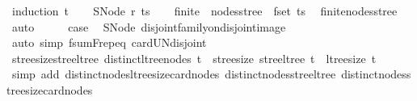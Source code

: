 \begin{isabellebody}
%
\isadelimproof
%
\endisadelimproof
%
\isatagproof
{}\isamarkupfalse%
\ {\isacharparenleft}{\kern0pt}induction\ t{\isacharparenright}{\kern0pt}\isanewline
\ \ \isamarkupfalse%
\ {\isacharparenleft}{\kern0pt}SNode\ r\ ts{\isacharparenright}{\kern0pt}\isanewline
\ \ \isamarkupfalse%
\ {\isachardoublequoteopen}finite\ {\isacharparenleft}{\kern0pt}{\isasymUnion}\ {\isacharparenleft}{\kern0pt}nodes{\isacharunderscore}{\kern0pt}stree\ {\isacharbackquote}{\kern0pt}\ fset\ ts{\isacharparenright}{\kern0pt}{\isacharparenright}{\kern0pt}{\isachardoublequoteclose}\ \isamarkupfalse%
\ finite{\isacharunderscore}{\kern0pt}nodes{\isacharunderscore}{\kern0pt}stree\ \isamarkupfalse%
\ auto\isanewline
\ \ \isamarkupfalse%
\ \isamarkupfalse%
\ {\isacharquery}{\kern0pt}case\ \isamarkupfalse%
\ SNode\ disjoint{\isacharunderscore}{\kern0pt}family{\isacharunderscore}{\kern0pt}on{\isacharunderscore}{\kern0pt}disjoint{\isacharunderscore}{\kern0pt}image\isanewline
\ \ \ \ \isamarkupfalse%
\ {\isacharparenleft}{\kern0pt}auto\ simp{\isacharcolon}{\kern0pt}\ fsum{\isachardot}{\kern0pt}F{\isachardot}{\kern0pt}rep{\isacharunderscore}{\kern0pt}eq\ card{\isacharunderscore}{\kern0pt}UN{\isacharunderscore}{\kern0pt}disjoint{\isacharprime}{\kern0pt}{\isacharparenright}{\kern0pt}\isanewline
{}\isamarkupfalse%
%
\endisatagproof
{\isafoldproof}%
%
\isadelimproof
\isanewline
%
\endisadelimproof
\isanewline
{}\isamarkupfalse%
\ stree{\isacharunderscore}{\kern0pt}size{\isacharunderscore}{\kern0pt}stree{\isacharunderscore}{\kern0pt}ltree{\isacharcolon}{\kern0pt}\ {\isachardoublequoteopen}distinct{\isacharunderscore}{\kern0pt}ltree{\isacharunderscore}{\kern0pt}nodes\ t\ {\isasymLongrightarrow}\ stree{\isacharunderscore}{\kern0pt}size\ {\isacharparenleft}{\kern0pt}stree{\isacharunderscore}{\kern0pt}ltree\ t{\isacharparenright}{\kern0pt}\ {\isacharequal}{\kern0pt}\ ltree{\isacharunderscore}{\kern0pt}size\ t{\isachardoublequoteclose}\isanewline
%
\isadelimproof
\ \ %
\endisadelimproof
%
\isatagproof
{}\isamarkupfalse%
\ {\isacharparenleft}{\kern0pt}simp\ add{\isacharcolon}{\kern0pt}\ distinct{\isacharunderscore}{\kern0pt}nodes{\isacharunderscore}{\kern0pt}ltree{\isacharunderscore}{\kern0pt}size{\isacharunderscore}{\kern0pt}card{\isacharunderscore}{\kern0pt}nodes\ distinct{\isacharunderscore}{\kern0pt}nodes{\isacharunderscore}{\kern0pt}stree{\isacharunderscore}{\kern0pt}ltree\ distinct{\isacharunderscore}{\kern0pt}nodes{\isacharunderscore}{\kern0pt}stree{\isacharunderscore}{\kern0pt}size{\isacharunderscore}{\kern0pt}card{\isacharunderscore}{\kern0pt}nodes{\isacharparenright}{\kern0pt}%

\end{isabellebody}
